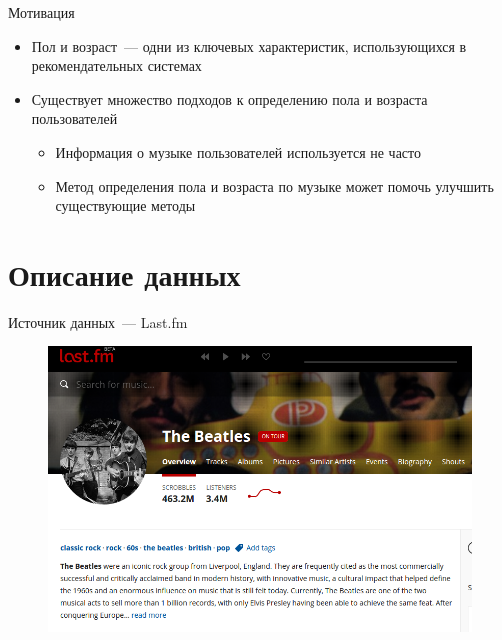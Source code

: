 \documentclass{beamer}
\begin{document}
\begin{frame}{Мотивация}
    \begin{itemize}
        \item {Пол и возраст~--- одни из ключевых характеристик,
            использующихся в рекомендательных системах}
        \pause
        \item {Существует множество подходов к определению пола
            и возраста пользователей}
            \begin{itemize}
                \item {Информация о музыке пользователей используется не часто}
                \item {Метод определения пола и возраста по музыке
                    может помочь улучшить существующие методы}
            \end{itemize}
    \end{itemize}
\end{frame}

\section{Описание данных}

\begin{frame}{Источник данных~--- Last.fm}
    \begin{figure}
        \includegraphics[width=\textwidth]{figures/lastfm.png}
    \end{figure}
\end{frame}
\end{document}
